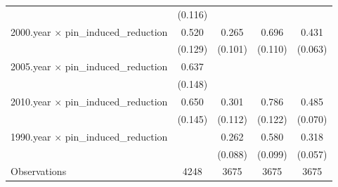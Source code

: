 \begin{table}[htbp]
{\begin{tabular}{l*{4}{c}}
                    &     (0.116)         &                     &                     &                     \\
2000.year $\times$ pin\_induced\_reduction&       0.520\sym{***}&       0.265\sym{***}&       0.696\sym{***}&       0.431\sym{***}\\
                    &     (0.129)         &     (0.101)         &     (0.110)         &     (0.063)         \\
2005.year $\times$ pin\_induced\_reduction&       0.637\sym{***}&                     &                     &                     \\
                    &     (0.148)         &                     &                     &                     \\
2010.year $\times$ pin\_induced\_reduction&       0.650\sym{***}&       0.301\sym{***}&       0.786\sym{***}&       0.485\sym{***}\\
                    &     (0.145)         &     (0.112)         &     (0.122)         &     (0.070)         \\
1990.year $\times$ pin\_induced\_reduction&                     &       0.262\sym{***}&       0.580\sym{***}&       0.318\sym{***}\\
                    &                     &     (0.088)         &     (0.099)         &     (0.057)         \\
Observations        &        4248         &        3675         &        3675         &        3675         \\
\hline\hline
\end{tabular}}
\end{table}
